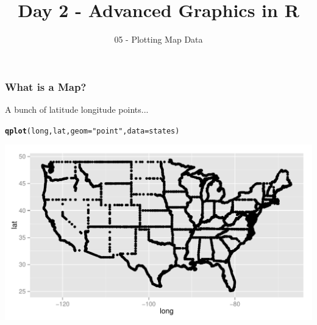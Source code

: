 \documentclass{beamer}\usepackage[]{graphicx}\usepackage[]{color}
\title[ 1-Intro]{Day 2 - Advanced Graphics in R}
\subtitle{05 - Plotting Map Data}
\date{\hspace{1in}}
\institute[ISU]{Iowa State University}
\makeatletter
\newcommand{\hlstr}[1]{\textcolor[rgb]{0.192,0.494,0.8}{#1}}%
\newcommand{\hlstd}[1]{\textcolor[rgb]{0.345,0.345,0.345}{#1}}%
\newcommand{\hlkwc}[1]{\textcolor[rgb]{0.333,0.667,0.333}{#1}}%
\newcommand{\hlkwd}[1]{\textcolor[rgb]{0.737,0.353,0.396}{\textbf{#1}}}%
\newenvironment{kframe}{%
 \def\at@end@of@kframe{}%
 \ifinner\ifhmode%
  \def\at@end@of@kframe{\end{minipage}}%
  \begin{minipage}{\columnwidth}%
 \fi\fi%
 \def\FrameCommand##1{\hskip\@totalleftmargin \hskip-\fboxsep
 \colorbox{shadecolor}{##1}\hskip-\fboxsep
     \hskip-\linewidth \hskip-\@totalleftmargin \hskip\columnwidth}%
 \MakeFramed {\advance\hsize-\width
   \@totalleftmargin\z@ \linewidth\hsize
   \@setminipage}}%
 {\par\unskip\endMakeFramed%
 \at@end@of@kframe}
\newenvironment{knitrout}{}{} %
\makeatother
\begin{document}
\begin{frame}
    \maketitle
\end{frame}



\begin{frame}[fragile]
    \frametitle{What is a Map?}

A bunch of latitude longitude points...

\small
\begin{knitrout}\footnotesize
{}\color{fgcolor}\begin{kframe}
\begin{alltt}
\hlkwd{qplot}\hlstd{(long, lat,} \hlkwc{geom}\hlstd{=}\hlstr{"point"}\hlstd{,} \hlkwc{data}\hlstd{=states)}
\end{alltt}
\end{kframe}
\includegraphics[width=\textwidth]{figure/kmappoints} 

\end{knitrout}
    \normalsize
\end{frame}

\end{document}
